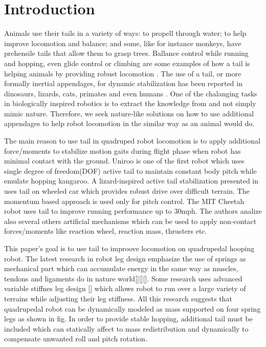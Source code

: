 \section{Introduction}\label{sec:introduction}

Animals use their tails in a variety of ways: to propell through water; to help improve locomotion and balance; and some, like for instance monkeys, have prehensile tails that allow them to grasp trees. Ballance control while running and hopping, even glide control or climbing are some examples of how a tail is helping animals by providing robust locomotion \cite{Thomas:Nature2012}. The use of a tail, or more formally inertial appendages, for dynamic stabilization has been reported in dinosaurs, lizards, cats, primates and even humans \cite{ostrom1969osteology,PijnappelsSringer,Walker199841,JusufiIOP2010}. One of the chalanging tasks in biologically inspired robotics is to extract the knowledge from and not simply mimic nature. Therefore, we seek nature-like solutions on how to use additional appendages to help robot locomotion in the similar way as an animal would do.  

The main reason to use tail in quadruped robot locomotion is to apply additional force/moments to stabilize motion gaits during flight phase when robot has minimal contact with the ground. Uniroo \cite{zeglin1991uniroo} is one of the first robot which uses single degree of freedom(DOF) active tail to maintain constant body pitch while emulate hopping kangaroo. A lizard-inspired active tail stabilization presented in \cite{conf/iros/Chang-SiuLTF11} uses tail on wheeled car which provides robust drive over difficult terrain. The momentum based approach is used only for pitch control. The MIT Cheetah robot \cite{DBLP:conf/iros/2012} uses tail to improve running performance up to 30mph. The authors analize also several others artificial mechanisms which can be used to apply non-contact forces/moments like reaction wheel, reaction mass, thrusters etc. 

This paper's goal is to use tail to improove locomotion on quadrupedal hooping robot. The latest research in robot leg design emphasize the use of springs as mechanical part which can accumulate energy in the same way as muscles, tendons and ligaments do in nature world[][][]. Some research uses advanced variable stiffnes leg design [] which allows robot to run over a large variety of terrains while adjusting their leg stiffness. All this research suggests that quadrupedal robot can be dynamically modeled as mass supported on four spring legs as shown in fig. In order to provide stable hopping, additional tail must be included which can statically affect to mass redistribution and dynamically to compensate unwanted roll and pitch rotation. 


